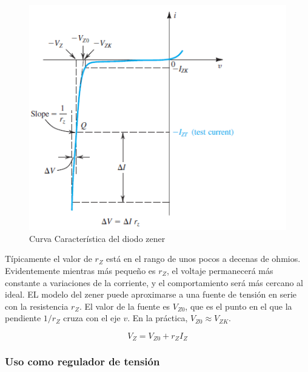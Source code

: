 \begin{figure}[H]
    \centering
    \includegraphics[scale=0.6]{Electronica/zener/zener_f1.png}
    \caption{Curva Característica del diodo zener}
    \label{FigDiodoZenerCurvaCaracteristica}
\end{figure}

Típicamente el valor de $r_Z$ está en el rango de unos pocos a decenas de ohmios. Evidentemente mientras más pequeño es $r_Z$, el voltaje permanecerá más constante a variaciones de la corriente, y el comportamiento será más cercano al ideal. EL modelo del zener puede aproximarse a una fuente de tensión en serie con la resistencia $r_Z$. El valor de la fuente es $V_{Z0}$, que es el punto en el que la pendiente $1/r_Z$ cruza con el eje $v$. En la práctica, $V_{Z0}\approx V_{ZK}$.

\begin{equation*}
V_Z = V_{Z0} + r_Z I_Z
\end{equation*}

\subsubsection{Uso como regulador de tensión}

